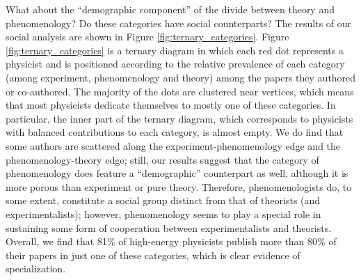 \documentclass[smallextended]{svjour3}
\begin{document}
What about the ``demographic component'' of the divide between theory and phenomenology? Do these categories have social counterparts? The results of our social analysis are shown in Figure \ref{fig:ternary_categories}. %
Figure \ref{fig:ternary_categories} is a ternary diagram in which each red dot represents a physicist and is positioned according to the relative prevalence of each category (among experiment, phenomenology and theory) among the papers they authored or co-authored. The majority of the dots are clustered near vertices, which means that most physicists dedicate themselves to mostly one of these categories. In particular, the inner part of the ternary diagram, which corresponds to physicists with balanced contributions to each category, is almost empty. We do find that some authors are scattered along the experiment-phenomenology edge and the phenomenology-theory edge; still, our results suggest that the category of phenomenology does feature a ``demographic'' counterpart as well, although it is more porous than experiment or pure theory. Therefore, phenomenologists do, to some extent, constitute a social group distinct from that of theorists (and experimentalists); however, phenomenology seems to play a special role in sustaining some form of cooperation between experimentalists and theorists. Overall, we find that 81\% of high-energy physicists publish more than 80\% of their papers in just one of these categories, which is clear evidence of specialization.
\end{document}
